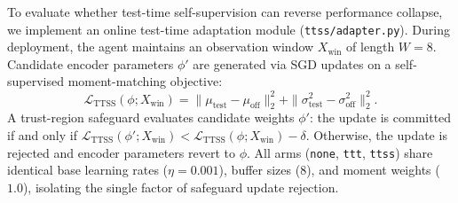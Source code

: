 To evaluate whether test-time self-supervision can reverse performance collapse, we implement an online test-time adaptation module (\texttt{ttss/adapter.py}).
During deployment, the agent maintains an observation window $X_{\mathrm{win}}$ of length $W = 8$.
Candidate encoder parameters $\phi'$ are generated via SGD updates on a self-supervised moment-matching objective:
\begin{equation}
    \mathcal{L}_\mathrm{TTSS}(\phi; X_{\mathrm{win}}) = \|\mu_{\mathrm{test}} - \mu_{\mathrm{off}}\|_2^2 + \|\sigma^2_{\mathrm{test}} - \sigma^2_{\mathrm{off}}\|_2^2.
\end{equation}
A trust-region safeguard evaluates candidate weights $\phi'$: the update is committed if and only if $\mathcal{L}_\mathrm{TTSS}(\phi'; X_{\mathrm{win}}) < \mathcal{L}_\mathrm{TTSS}(\phi; X_{\mathrm{win}}) - \delta$. Otherwise, the update is rejected and encoder parameters revert to $\phi$.
All arms (\texttt{none}, \texttt{ttt}, \texttt{ttss}) share identical base learning rates ($\eta = 0.001$), buffer sizes ($8$), and moment weights ($1.0$), isolating the single factor of safeguard update rejection.
